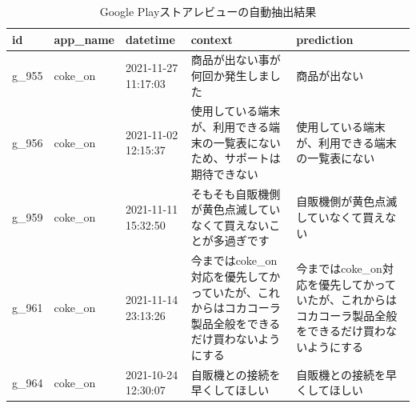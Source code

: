 \begin{table}[H]
  \caption{Google Playストアレビューの自動抽出結果}
  \label{tb:googleqa}
  \small
  \begin{center}
  \begin{tabularx}{\linewidth}{|l|l|X|X|X|}
    \hline
    id&app\_name&datetime&context&prediction\\\hline\hline
    g\_955&coke\_on&2021-11-27 11:17:03&商品が出ない事が何回か発生しました&商品が出ない\\\hline
    g\_956&coke\_on&2021-11-02 12:15:37&使用している端末が、利用できる端末の一覧表にないため、サポートは期待できない&使用している端末が、利用できる端末の一覧表にない\\\hline
    g\_959&coke\_on&2021-11-11 15:32:50&そもそも自販機側が黄色点滅していなくて買えないことが多過ぎです&自販機側が黄色点滅していなくて買えない\\\hline
    g\_961&coke\_on&2021-11-14 23:13:26&今まではcoke\_on対応を優先してかっていたが、これからはコカコーラ製品全般をできるだけ買わないようにする&今まではcoke\_on対応を優先してかっていたが、これからはコカコーラ製品全般をできるだけ買わないようにする\\\hline
    g\_964&coke\_on&2021-10-24 12:30:07&自販機との接続を早くしてほしい&自販機との接続を早くしてほしい\\\hline
  \end{tabularx}\end{center}
\end{table}

